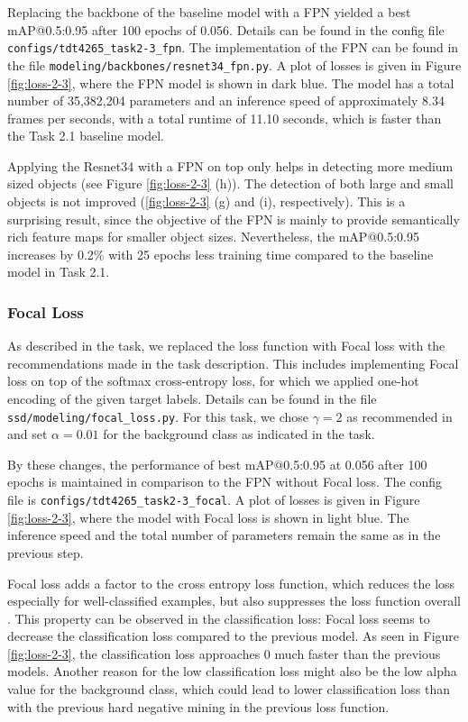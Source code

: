 \documentclass{article}
\begin{document}
Replacing the backbone of the baseline model with a FPN yielded a best mAP@0.5:0.95 after 100 epochs of 0.056. Details can be found in the config file \texttt{configs/tdt4265\_task2-3\_fpn}.  The implementation of the FPN can be found in the file \texttt{modeling/backbones/resnet34\_fpn.py}.  A plot of losses is given in Figure \ref{fig:loss-2-3}, where the FPN model is shown in dark blue. The model has a total number of 35,382,204 parameters and an inference speed of approximately 8.34 frames per seconds, with a total runtime of 11.10 seconds, which is faster than the Task 2.1 baseline model.

Applying the Resnet34 with a FPN on top only helps in detecting more medium sized objects (see Figure \ref{fig:loss-2-3} (h)). The detection of both large and small objects is not improved (\ref{fig:loss-2-3} (g) and (i), respectively). This is a surprising result, since the objective of the FPN is mainly to provide semantically rich feature maps for smaller object sizes. Nevertheless, the mAP@0.5:0.95 increases by 0.2\% with 25 epochs less training time compared to the baseline model in Task 2.1.

\subsubsection*{Focal Loss}
As described in the task, we replaced the loss function with Focal loss \cite{lin2017focal} with the recommendations made in the task description. This includes implementing Focal loss on top of the softmax cross-entropy loss, for which we applied one-hot encoding of the given target labels. Details can be found in the file \texttt{ssd/modeling/focal\_loss.py}. For this task, we chose $\gamma = 2$ as recommended in \cite{lin2017focal} and set $\alpha = 0.01$ for the background class as indicated in the task. 

By these changes, the performance of best mAP@0.5:0.95 at 0.056 after 100 epochs is maintained in comparison to the FPN without Focal loss. The config file is \texttt{configs/tdt4265\_task2-3\_focal}. A plot of losses is given in Figure \ref{fig:loss-2-3}, where the model with Focal loss is shown in light blue. The inference speed and the total number of parameters remain the same as in the previous step.

Focal loss adds a factor to the cross entropy loss function, which reduces the loss especially for well-classified examples, but also suppresses the loss function overall \cite{lin2017focal}. This property can be observed in the classification loss: Focal loss seems to decrease the classification loss compared to the previous model. As seen in Figure \ref{fig:loss-2-3}, the classification loss approaches 0 much faster than the previous models. Another reason for the low classification loss might also be the low alpha value for the background class, which could lead to lower classification loss than with the previous hard negative mining in the previous loss function. 
\end{document}
